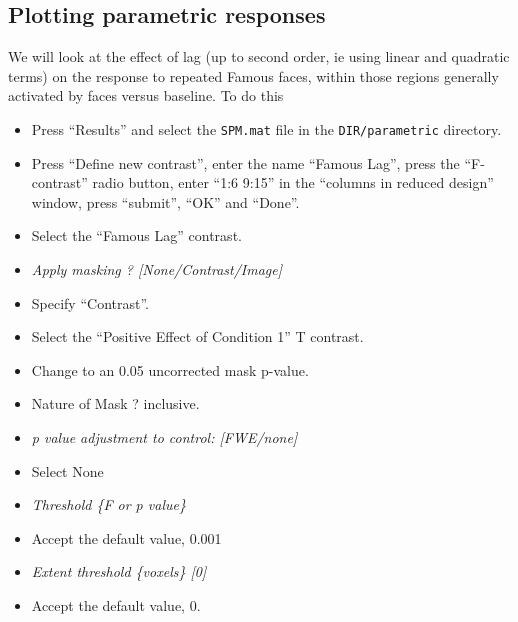 \subsection{Plotting parametric responses}

We will look at the effect of lag (up to second order, ie using linear and quadratic terms) on the response to repeated Famous faces, within those regions generally activated by faces versus baseline. To do this
\begin{itemize}
\item Press ``Results'' and select the \texttt{SPM.mat} file in the \texttt{DIR/parametric} directory.
\item Press ``Define new contrast'', enter the name ``Famous Lag'', press the ``F-contrast'' radio button, enter ``1:6 9:15'' in the ``columns in reduced design'' window, press ``submit'', ``OK'' and ``Done''.
\item Select the ``Famous Lag'' contrast.
\item \emph{Apply masking ? [None/Contrast/Image]}
\item Specify ``Contrast''.
\item Select the ``Positive Effect of Condition 1'' T contrast.
\item Change to an 0.05 uncorrected mask p-value.
\item Nature of Mask ? inclusive.
\item \emph{p value adjustment to control: [FWE/none]}
\item Select None
\item \emph{Threshold \{F or p value\}}
\item Accept the default value, 0.001
\item \emph{Extent threshold \{voxels\} [0]}
\item Accept the default value, 0.
\end{itemize}

